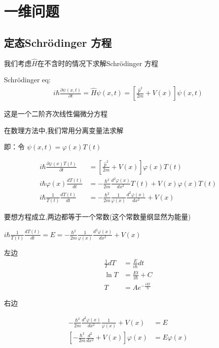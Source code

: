 \documentclass[lang=cn,15pt]{elegantbook}
\begin{document}
\chapter{一维问题}
\section{定态Schrödinger 方程}

我们考虑$\hat{H}$在不含时的情况下求解Schrödinger 方程

Schrödinger eq:\begin{align*}
	i \hbar \frac{\partial \psi(x, t)}{\partial t} = \hat{H} \psi(x, t) 
	= \left[ \frac{\hat{p}^2}{2m} + V(x) \right] \psi(x, t)
\end{align*}

这是一个二阶齐次线性偏微分方程

在数理方法中,我们常用分离变量法求解

即：令 \(\psi(x, t) = \varphi(x) T(t)\)

\begin{align*}
	i \hbar \frac{\partial \varphi(x) T(t)}{\partial t} &= \left[ \frac{\hat{p}^2}{2m} + V(x) \right]\varphi(x) T(t) \\
	i \hbar \varphi(x) \frac{d T(t)}{d t} &= -\frac{\hbar^2}{2m} \frac{d^2 \varphi(x)}{d x^2} T(t) + V(x) \varphi(x) T(t) \\
	i \hbar \frac{1}{T(t)} \frac{d T(t)}{d t} &= -\frac{\hbar^2}{2m} \frac{1}{\varphi(x)} \frac{d^2 \varphi(x)}{d x^2} + V(x)
\end{align*}

要想方程成立,两边都等于一个常数(这个常数量纲显然为能量)

$i \hbar \frac{1}{T(t)} \frac{d T(t)}{d t} =E= -\frac{\hbar^2}{2m} \frac{1}{\varphi(x)} \frac{d^2 \varphi(x)}{d x^2} + V(x)$


左边
\begin{align*}
	\frac{1}{T} dT &= \frac{E}{i\hbar} dt \\
	\ln T &= \frac{Et}{i\hbar} + C \\
	T &= A e^{-\frac{iEt}{\hbar}}
\end{align*}

右边

\begin{align*}
	-\frac{\hbar^2}{2m} \frac{d^2 \varphi(x)}{dx^2} \frac{1}{\varphi(x)} + V(x) &= E \\
	\left[ -\frac{\hbar^2}{2m} \frac{d^2}{dx^2} + V(x) \right] \varphi(x) &= E \varphi(x)
\end{align*}
\end{document}
